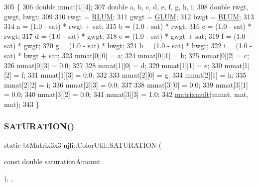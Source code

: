 \begin{DoxyCode}
305     \{
306       \textcolor{keywordtype}{double} mmat[4][4];
307       \textcolor{keywordtype}{double} a, b, c, d, e, f, g, h, i;
308       \textcolor{keywordtype}{double} rwgt, gwgt, bwgt;
309 
310       rwgt = \mbox{\hyperlink{_color_util_8h_a463792f2fa66c99a8329aae43be4c7fd}{RLUM}};
311       gwgt = \mbox{\hyperlink{_color_util_8h_a0faedcf9d84cbca5ee944af29148f6c1}{GLUM}};
312       bwgt = \mbox{\hyperlink{_color_util_8h_af5ec63b487cb34b43575bb5bf7589513}{BLUM}};
313 
314       a = (1.0 - sat) * rwgt + sat;
315       b = (1.0 - sat) * rwgt;
316       c = (1.0 - sat) * rwgt;
317       d = (1.0 - sat) * gwgt;
318       e = (1.0 - sat) * gwgt + sat;
319       f = (1.0 - sat) * gwgt;
320       g = (1.0 - sat) * bwgt;
321       h = (1.0 - sat) * bwgt;
322       i = (1.0 - sat) * bwgt + sat;
323       mmat[0][0] = a;
324       mmat[0][1] = b;
325       mmat[0][2] = c;
326       mmat[0][3] = 0.0;
327 
328       mmat[1][0] = d;
329       mmat[1][1] = e;
330       mmat[1][2] = f;
331       mmat[1][3] = 0.0;
332 
333       mmat[2][0] = g;
334       mmat[2][1] = h;
335       mmat[2][2] = i;
336       mmat[2][3] = 0.0;
337 
338       mmat[3][0] = 0.0;
339       mmat[3][1] = 0.0;
340       mmat[3][2] = 0.0;
341       mmat[3][3] = 1.0;
342       \mbox{\hyperlink{classnjli_1_1_color_util_a5cb3576c8177f303c88dc4e7283367c7}{matrixmult}}(mmat, mat, mat);
343     \}
\end{DoxyCode}
\mbox{\label{classnjli_1_1_color_util_ad4d4feb55fb385c1720dbae9ae5a0d20}} 
\subsubsection{\texorpdfstring{S\+A\+T\+U\+R\+A\+T\+I\+O\+N()}{SATURATION()}}
{\footnotesize\ttfamily static bt\+Matrix3x3 njli\+::\+Color\+Util\+::\+S\+A\+T\+U\+R\+A\+T\+I\+ON (\begin{DoxyParamCaption}\item[{const double}]{saturation\+Amount }\end{DoxyParamCaption})\hspace{0.3cm}{\ttfamily [inline]}, {\ttfamily [static]}, {\ttfamily [private]}}



